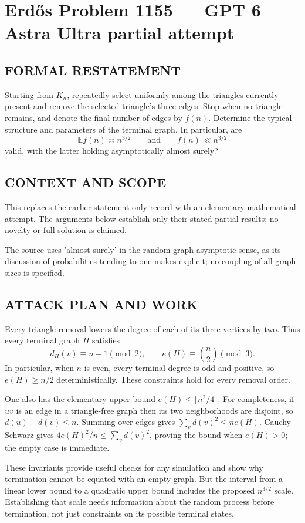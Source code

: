 \section*{Erd\H{o}s Problem 1155 --- GPT 6 Astra Ultra partial attempt}


\subsection*{FORMAL RESTATEMENT}
Starting from $K_n$, repeatedly select uniformly among the triangles currently present and remove the selected triangle's three edges. Stop when no triangle remains, and denote the final number of edges by $f(n)$. Determine the typical structure and parameters of the terminal graph. In particular, are
\[
\mathbb E f(n)\asymp n^{3/2}\qquad\text{and}\qquad f(n)\ll n^{3/2}
\]
valid, with the latter holding asymptotically almost surely?

\subsection*{CONTEXT AND SCOPE}
This replaces the earlier statement-only record with an elementary mathematical attempt. The arguments below establish only their stated partial results; no novelty or full solution is claimed.

The source uses 'almost surely' in the random-graph asymptotic sense, as its discussion of probabilities tending to one makes explicit; no coupling of all graph sizes is specified.

\subsection*{ATTACK PLAN AND WORK}
Every triangle removal lowers the degree of each of its three vertices by two.
Thus every terminal graph $H$ satisfies
\[d_H(v)\equiv n-1\pmod2,\qquad e(H)\equiv\binom n2\pmod3.\tag{1}\]
In particular, when $n$ is even, every terminal degree is odd and positive, so
$e(H)\ge n/2$ deterministically. These constraints hold for every removal order.

One also has the elementary upper bound $e(H)\le\lfloor n^2/4\rfloor$.
For completeness, if $uv$ is an edge in a triangle-free graph then its two
neighborhoods are disjoint, so $d(u)+d(v)\le n$. Summing over edges gives
$\sum_vd(v)^2\le ne(H)$. Cauchy--Schwarz gives
$4e(H)^2/n\le\sum_vd(v)^2$, proving the bound when $e(H)>0$; the empty case is immediate.

These invariants provide useful checks for any simulation and show why termination
cannot be equated with an empty graph. But the interval from a linear lower bound
to a quadratic upper bound includes the proposed $n^{3/2}$ scale. Establishing
that scale needs information about the random process before termination, not
just constraints on its possible terminal states.

